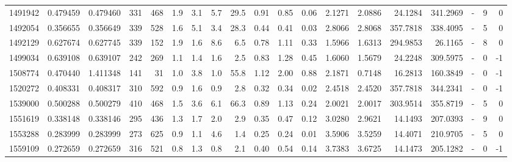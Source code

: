 \begin{tabular}{rrrrrrrrrrrrrrrrlrr}
   1491942 & 0.479459 &   0.479460 &  331 &  468 &      1.9 &      3.1 &     5.7 &     29.5 &       0.91 &        0.85 &        0.06 &  2.1271 &  2.0886 &   24.1284 &  341.2969 &             - &        9 &          0 \\
   1492054 & 0.356655 &   0.356649 &  339 &  528 &      1.6 &      5.1 &     3.4 &     28.3 &       0.44 &        0.41 &        0.03 &  2.8066 &  2.8068 &  357.7818 &  338.4095 &             - &        5 &          0 \\
   1492129 & 0.627674 &   0.627745 &  339 &  152 &      1.9 &      1.6 &     8.6 &      6.5 &       0.78 &        1.11 &        0.33 &  1.5966 &  1.6313 &  294.9853 &   26.1165 &             - &        8 &          0 \\
   1499034 & 0.639108 &   0.639107 &  242 &  269 &      1.1 &      1.4 &     1.6 &      2.5 &       0.83 &        1.28 &        0.45 &  1.6060 &  1.5679 &   24.2248 &  309.5975 &             - &        0 &         -1 \\
   1508774 & 0.470440 &   1.411348 &  141 &   31 &      1.0 &      3.8 &     1.0 &     55.8 &       1.12 &        2.00 &        0.88 &  2.1871 &  0.7148 &   16.2813 &  160.3849 &             - &        0 &         -1 \\
   1520272 & 0.408331 &   0.408317 &  310 &  592 &      0.9 &      1.6 &     0.9 &      2.8 &       0.32 &        0.34 &        0.02 &  2.4518 &  2.4520 &  357.7818 &  344.2341 &             - &        0 &         -1 \\
   1539000 & 0.500288 &   0.500279 &  410 &  468 &      1.5 &      3.6 &     6.1 &     66.3 &       0.89 &        1.13 &        0.24 &  2.0021 &  2.0017 &  303.9514 &  355.8719 &             - &        5 &          0 \\
   1551619 & 0.338148 &   0.338146 &  295 &  436 &      1.3 &      1.7 &     2.0 &      2.9 &       0.35 &        0.47 &        0.12 &  3.0280 &  2.9621 &   14.1493 &  207.0393 &             - &        9 &          0 \\
   1553288 & 0.283999 &   0.283999 &  273 &  625 &      0.9 &      1.1 &     4.6 &      1.4 &       0.25 &        0.24 &        0.01 &  3.5906 &  3.5259 &   14.4071 &  210.9705 &             - &        5 &          0 \\
   1559109 & 0.272659 &   0.272659 &  316 &  521 &      0.8 &      1.3 &     0.8 &      2.1 &       0.40 &        0.54 &        0.14 &  3.7383 &  3.6725 &   14.1473 &  205.1282 &             - &        0 &         -1 \\

\end{tabular}
